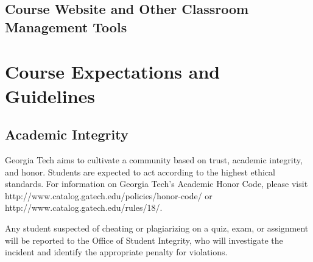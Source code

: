 \documentclass[10pt]{article}
\begin{document}
\subsection*{Course Website and Other Classroom Management Tools}

\section{Course Expectations and Guidelines}
%

\subsection*{Academic Integrity}
Georgia Tech aims to cultivate a community based on trust, academic integrity, and honor. Students are expected to act according to the highest ethical standards.  For information on Georgia Tech's Academic Honor Code, please visit http://www.catalog.gatech.edu/policies/honor-code/ or http://www.catalog.gatech.edu/rules/18/.

Any student suspected of cheating or plagiarizing on a quiz, exam, or assignment will be reported to the Office of Student Integrity, who will investigate the incident and identify the appropriate penalty for violations.
%
\end{document}
